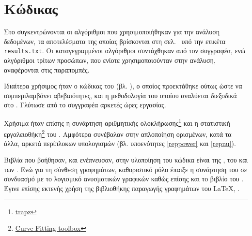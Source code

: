 \chapter{Κώδικας \matlab}\label{app:codeAppendix}
\begin{refsection}

\noindent Στο  συγκεντρώνονται οι αλγόριθμοι που χρησιμοποιήθηκαν για την ανάλυση δεδομένων, τα αποτελέσματα της οποίας βρίσκονται στη σελ.~\pageref{results} υπό την ετικέτα \texttt{results.txt}. Οι καταγεγραμμένοι αλγόριθμοι συντάχθηκαν από τον συγγραφέα, ενώ αλγόριθμοι τρίτων προσώπων, που ενίοτε χρησιμοποιούνταν στην ανάλυση, αναφέρονται στις παραπομπές.

Ιδιαίτερα χρήσιμος ήταν ο κώδικας του \citeauthor{Kis2021} \cite{Kis2021} (βλ. ), ο οποίος προεκτάθηκε ούτως ώστε να συμπεριλαμβάνει αβεβαιότητες, και η μεθοδολογία του οποίου αναλύεται διεξοδικά στο . Γλύτωσε από το συγγραφέα αρκετές ώρες εργασίας.

Χρήσιμα ήταν επίσης η συνάρτηση αριθμητικής ολοκλήρωσης\footnote{\href{https://se.mathworks.com/help/matlab/ref/trapz.html}{trapz}} \cite{matlabtrapz} και η στατιστική εργαλειοθήκη\footnote{\href{https://www.mathworks.com/products/curvefitting.html}{Curve Fitting toolbox}} \cite{matlabcurvefitting} του \matlab. Αμφότερα συνέβαλαν στην απλοποίηση ορισμένων, κατά τα άλλα, αρκετά περίπλοκων υπολογισμών (βλ. υποενότητες \ref{reppower} και \ref{repnu}).

Βιβλία που βοήθησαν, και ενέπνευσαν, στην υλοποίηση του κώδικα είναι της \citeauthor{2018_Attaway_BOOK} \cite{2018_Attaway_BOOK}, του \citeauthor{2010_Johnson_BOOK} \cite{2010_Johnson_BOOK} και των \citeauthor{2012_Patera_BOOK} \cite{2012_Patera_BOOK}. Ενώ για τη σύνθεση γραφημάτων, καθοριστικό ρόλο έπαιξε η συνάρτηση του \citeauthor{Jong2016} \cite{Jong2016} σε συνδυασμό με το λογισμικό ανυσματικών γραφικών \inkscape \parencites{2009_Kirsanov_BOOK}{2017_Mark_BOOK} καθώς επίσης και το βιβλίο του \citeauthor{2001_Tufte_BOOK} \cite{2001_Tufte_BOOK}. Έγινε επίσης εκτενής χρήση της βιβλιοθήκης παραγωγής γραφημάτων του \LaTeX, \TikZ \cite{Tantau2013}.







\end{refsection}
